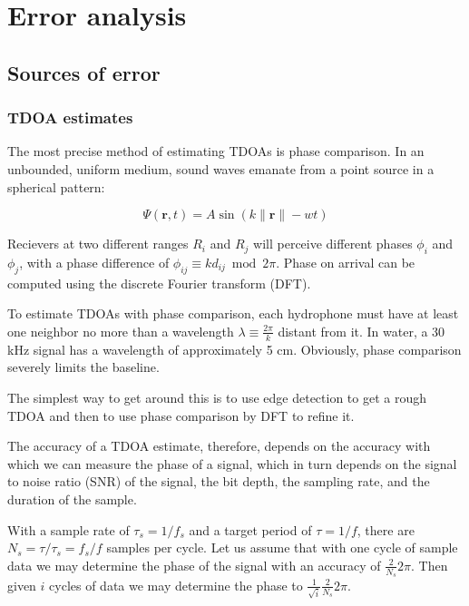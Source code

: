 \documentclass[10pt]{article}
\begin{document}
\section{Error analysis}

\subsection{Sources of error}

\subsubsection{TDOA estimates}\label{sec:tdoa-error}

The most precise method of estimating TDOAs is phase comparison.  In an unbounded, uniform medium, sound waves emanate from a point source in a spherical pattern:

\begin{equation}
\Psi(\mathbf{r},t)=A\sin(k\|\mathbf{r}\|-wt)
\end{equation}

Recievers at two different ranges \(R_i\) and \(R_j\) will perceive different phases \(\phi_i\) and \(\phi_j\), with a phase difference of \(\phi_{ij} \equiv kd_{ij}\bmod{2\pi}\).  Phase on arrival can be computed using the discrete Fourier transform (DFT).

To estimate TDOAs with phase comparison, each hydrophone must have at least one neighbor no more than a wavelength \(\lambda\equiv\frac{2\pi}{k}\) distant from it.  In water, a 30 kHz signal has a wavelength of approximately 5 cm.  Obviously, phase comparison severely limits the baseline.

The simplest way to get around this is to use edge detection to get a rough TDOA and then to use phase comparison by DFT to refine it.

The accuracy of a TDOA estimate, therefore, depends on the accuracy with which we can measure the phase of a signal, which in turn depends on the signal to noise ratio (SNR) of the signal, the bit depth, the sampling rate, and the duration of the sample.

With a sample rate of \(\tau_s=1/f_s\) and a target period of \(\tau=1/f\), there are \(N_s=\tau/\tau_s=f_s/f\) samples per cycle.  Let us assume that with one cycle of sample data we may determine the phase of the signal with an accuracy of \(\frac{2}{N_s}2\pi\).  Then given \(i\) cycles of data we may determine the phase to \(\frac{1}{\sqrt i}\frac{2}{N_s}2\pi\).
\end{document}
